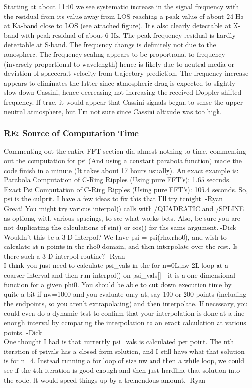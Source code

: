 \documentclass[crop=false,class=article,oneside]{standalone}
\begin{document}
Starting at about 11:40 we see systematic increase in the signal frequency with the residual from its value away from LOS reaching a peak value of about 24 Hz at Ka-band close to LOS (see attached figure).  It’s also clearly detectable at X-band with peak residual of about 6 Hz. The peak frequency residual is hardly detectable at S-band. The frequency change is definitely not due to the ionosphere. The frequency scaling appears to be proportional to frequency (inversely proportional to wavelength) hence is likely due to neutral media or deviation of spacecraft velocity from trajectory prediction.  The frequency increase appears to eliminates the latter since atmospheric drag is expected to slightly slow down Cassini, hence decreasing not increasing the received Doppler shifted frequency. If true, it would appear that Cassini signals began to sense the upper neutral  atmosphere, but I’m not sure since Cassini altitude was too high.

\subsubsection{\footnotesize RE: Source of Computation Time}
Commenting out the entire FFT section did almost nothing to time, commenting out the computation for psi (And using a constant parabola function) made the code finish in a minute (It takes about 17 hours usually). An exact example is: Parabola Computation of C-Ring Ripples (Using pure FFT's): 1.65 seconds. Exact Psi Computation of C-Ring Ripples (Using pure FFT's): 106.4 seconds. So, psi is the culprit. I have a few ideas to fix this that I'll try tonight. -Ryan\\
Great! You might try various interpol() calls with /QUADRATIC and /SPLINE as options, with various spacings, to see what works bets. Also, be sure you are not duplicating the calculations of sin() or cos() for the same argument. -Dick\\
Wouldn't this be a 3-D interpol? We have psi = psi(rho,rho0), and wish to calculate at n points in the rho0 domain, and then interpolate over the rest. Is there such a 3-D interpol routine? -Ryan\\
I think you just need to calculate psi\_vals in the for n=0L,nw-2L loop at a coarser interval and then run interpol() on psi\_vals[] - it is a one-dimensional function for a given phi0. You should be able to cut down execution time by quite a bit if nw=1000 and you evaluate only at, say 100 or 200 points (including the endpoints, so you aren't extrapolating) and then interpolate. If necessary, you could even do a dynamic test to confirm that your interpolation is done at a fine enough interval by comparing the interpolation to an exact calculation at various points. -Dick\\
One thought I had is that currently psi\_vals is calculated per point. The nth iteration of psivals has a closed form solution, and I still have what that solution is for n=4. Instead running a for loop of size nw and then a while loop, we could see if the 4th iteration is good enough and then just hardline that solution into the code. It would speed things up by a tremendous amount. -Ryan\\
\end{document}
